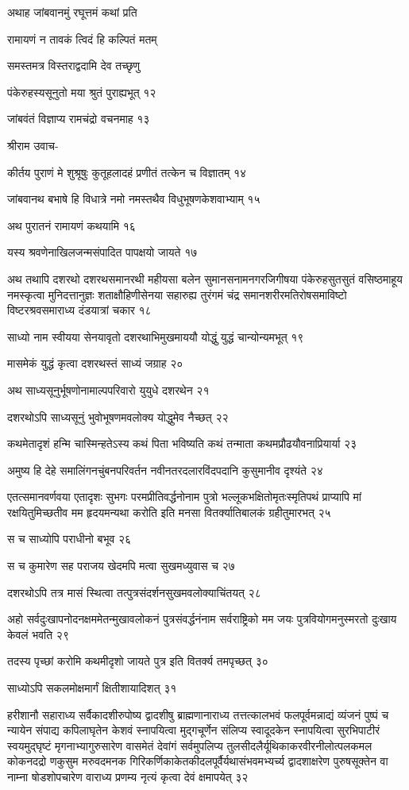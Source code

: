 अथाह जांबवानमुं रघूत्तमं कथां प्रति

रामायणं न तावकं त्विदं हि कल्पितं मतम्

समस्तमत्र विस्तराद्वदामि देव तच्छृणु

पंकेरुहस्यसूनुतो मया श्रुतं पुराह्यभूत् १२

जांबवंतं विज्ञाप्य रामचंद्रो वचनमाह १३

श्रीराम उवाच-

कीर्तय पुराणं मे शुश्रूषुः कुतूहलादहं प्रणीतं तत्केन च विज्ञातम् १४

जांबवानथ बभाषे हि विधात्रे नमो नमस्तथैव विधुभूषणकेशवाभ्याम् १५

अथ पुरातनं रामायणं कथयामि १६

यस्य श्रवणेनाखिलजन्मसंपादित पापक्षयो जायते १७

अथ तथापि दशरथो दशरथसमानरथी महीयसा बलेन सुमानसनामनगरजिगीषया पंकेरुहसुतसुतं
वसिष्ठमाहूय नमस्कृत्वा मुनिदत्तानुज्ञः शताक्षौहिणीसेनया सहारुह्य तुरंगमं चंद्र
समानशरीरमतिरोषसमाविष्टो विष्टरश्रवसमाराध्य दंडयात्रां चकार १८

साध्यो नाम स्वीयया सेनयावृतो दशरथाभिमुखमाययौ योद्धुं युद्धं चान्योन्यमभूत् १९

मासमेकं युद्धं कृत्वा दशरथस्तं साध्यं जग्राह २०

अथ साध्यसूनुर्भूषणोनामाल्पपरिवारो युयुधे दशरथेन २१

दशरथोऽपि साध्यसूनुं भुवोभूषणमवलोक्य योद्धुमेव नैच्छत् २२

कथमेतादृशं हन्मि चास्मिन्हतेऽस्य कथं पिता भविष्यति कथं तन्माता कथमप्रौढयौवनाप्रियार्या
२३

अमुष्य हि देहे समालिंगनचुंबनपरिवर्तन नवीनतरदलारविंदपदानि कुसुमानीव दृश्यंते २४

एतत्समानवर्णवया एतादृशः सुभगः परमप्रीतिवर्द्धनोनाम पुत्रो भल्लूकभक्षितोमृतःस्मृतिपथं
प्राप्यापि मां रक्षयितुमिच्छतीव मम हृदयमन्यथा करोति इति मनसा वितर्क्यातिबालकं
ग्रहीतुमारभत् २५

स च साध्योपि पराधीनो बभूव २६

स च कुमारेण सह पराजय खेदमपि मत्वा सुखमध्युवास च २७

दशरथोऽपि तत्र मासं स्थित्वा तत्पुत्रसंदर्शनसुखमवलोक्याचिंतयत् २८

अहो सर्वदुःखापनोदनक्षममेतन्मुखावलोकनं पुत्रसंवर्द्धनंनाम सर्वराष्ट्रिको मम जयः
पुत्रवियोगमनुस्मरतो दुःखाय केवलं भवति २९

तदस्य पृच्छां करोमि कथमीदृशो जायते पुत्र इति वितर्क्य तमपृच्छत् ३०

साध्योऽपि सकलमोक्षमार्गं क्षितीशायादिशत् ३१

हरीशानौ सहाराध्य सर्वैकादशीरुपोष्य द्वादशीषु ब्राह्मणानाराध्य तत्तत्कालभवं
फलपूर्वमन्नाद्यं व्यंजनं पुष्पं च न्यायेन संपाद्य कपिलाघृतेन केशवं स्नापयित्वा मुद्गचूर्णेन संलिप्य
स्वादूदकेन स्नापयित्वा सुरभिपाटीरं स्वयमुद्घृष्टं मृगनाभ्यागुरुसारेण वासमेतं देवांगं सर्वमुपलिप्य
तुलसीदलैर्यूथिकाकरवीरनीलोत्पलकमल कोकनदद्रो णकुसुम मरुवदमनक
गिरिकर्णिकाकेतकीदलपूर्वैर्यथासंभवमभ्यर्च्य द्वादशाक्षरेण पुरुषसूक्तेन वा नाम्ना षोडशोपचारेण
वाराध्य प्रणम्य नृत्यं कृत्वा देवं क्षमापयेत् ३२

